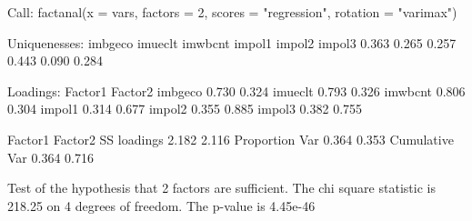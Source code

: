 
Call:
factanal(x = vars, factors = 2, scores = "regression", rotation = "varimax")

Uniquenesses:
imbgeco imueclt imwbcnt  impol1  impol2  impol3 
  0.363   0.265   0.257   0.443   0.090   0.284 

Loadings:
        Factor1 Factor2
imbgeco 0.730   0.324  
imueclt 0.793   0.326  
imwbcnt 0.806   0.304  
impol1  0.314   0.677  
impol2  0.355   0.885  
impol3  0.382   0.755  

               Factor1 Factor2
SS loadings      2.182   2.116
Proportion Var   0.364   0.353
Cumulative Var   0.364   0.716

Test of the hypothesis that 2 factors are sufficient.
The chi square statistic is 218.25 on 4 degrees of freedom.
The p-value is 4.45e-46 
